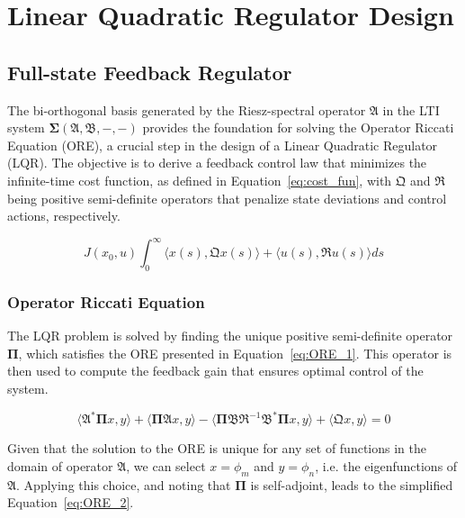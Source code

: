 \section{Linear Quadratic Regulator Design}

\subsection{Full-state Feedback Regulator}

The bi-orthogonal basis generated by the Riesz-spectral operator $\mathfrak{A}$ in the LTI system $\mathbf{\Sigma(\mathfrak{A},\mathfrak{B},-,-)}$ provides the foundation for solving the Operator Riccati Equation (ORE), a crucial step in the design of a Linear Quadratic Regulator (LQR). The objective is to derive a feedback control law that minimizes the infinite-time cost function, as defined in Equation~\ref{eq:cost_fun}, with $\mathfrak{Q}$ and $\mathfrak{R}$ being positive semi-definite operators that penalize state deviations and control actions, respectively.

\begin{equation} \label{eq:cost_fun}
    J(x_0, u) \int_0^{\infty} \langle x(s), \mathfrak{Q} x(s)\rangle + \langle u(s), \mathfrak{R} u(s)\rangle ds
\end{equation}

\subsubsection{Operator Riccati Equation}

The LQR problem is solved by finding the unique positive semi-definite operator $\mathbf{\Pi}$, which satisfies the ORE presented in Equation~\ref{eq:ORE_1}. This operator is then used to compute the feedback gain that ensures optimal control of the system.

\begin{equation} \label{eq:ORE_1}
    \langle \mathfrak{A}^* \mathbf{\Pi} x, y\rangle + \langle \mathbf{\Pi} \mathfrak{A} x, y \rangle - \langle \mathbf{\Pi} \mathfrak{B} \mathfrak{R}^{-1} \mathfrak{B}^* \mathbf{\Pi} x, y\rangle + \langle \mathfrak{Q} x, y\rangle = 0
\end{equation}

Given that the solution to the ORE is unique for any set of functions in the domain of operator $\mathfrak{A}$, we can select $x = \phi_m$ and $y = \phi_n$, i.e. the eigenfunctions of $\mathfrak{A}$. Applying this choice, and noting that $\mathbf{\Pi}$ is self-adjoint, leads to the simplified Equation~\ref{eq:ORE_2}.

